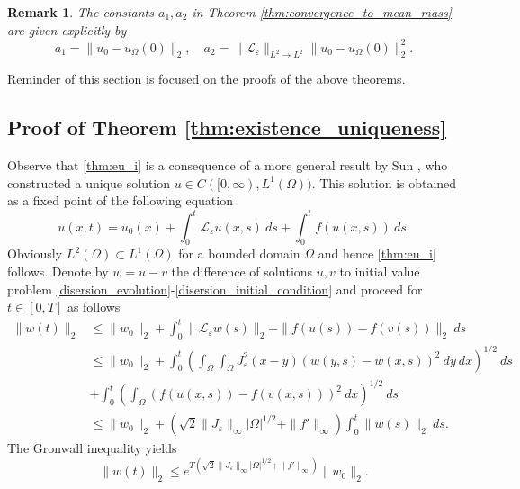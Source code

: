 \documentclass[12pt, a4paper]{article}
\theoremstyle{break}
\theoremstyle{break}
\theoremstyle{break}
\newtheorem{rem}{Remark}[section]
\theoremstyle{break}
\theoremstyle{break}
\newcommand{\Leo}{\mathcal{L}_{\varepsilon}}
\begin{document}
\begin{rem}
    The constants $a_1, a_2$ in Theorem \ref{thm:convergence_to_mean_mass} are given explicitly by
    \begin{equation*}
        a_1 = \|u_0 - u_{\Omega}(0)\|_2, \quad a_2 = \|\Leo\|_{L^2 \rightarrow L^2} \|u_0 - u_{\Omega}(0)\|_2^2. \label{thm:mean_mass_convergence}
    \end{equation*}
\end{rem}

Reminder of this section is focused on the proofs of the above theorems.

\subsection{Proof of Theorem \ref{thm:existence_uniqueness}}

Observe that \ref{thm:eu_i} is a consequence of a more general result by Sun \cite{Sun2022}, who constructed a unique solution $u \in C([0, \infty), L^1(\Omega))$. This solution is obtained as a fixed point of the following equation
\begin{equation}
    u(x,t) = u_0(x) + \int_0^t \Leo u(x,s) \:ds + \int_0^t f(u(x,s))\:ds.
    \label{ala_duhamel_formula}
\end{equation}
Obviously $L^2(\Omega) \subset L^1(\Omega)$ for a bounded domain $\Omega$ and hence \ref{thm:eu_i} follows. Denote by $w = u - v$ the difference of solutions $u, v$ to initial value problem \eqref{disersion_evolution}-\eqref{disersion_initial_condition} and proceed for $t \in [0, T]$ as follows
\begin{align*}
    \| w(t) \|_2 &\leq \|w_0\|_2 + \int_0^t \|\Leo w (s)\|_2 + \|f(u(s)) - f(v(s))\|_2 \:ds \\
    &\leq \|w_0\|_2 + \int_0^t\left(\int_\Omega \int_\Omega J_\varepsilon^2(x-y)\left(w(y, s) - w(x, s)\right)^2\:dy\:dx\right)^{1/2}\:ds \\
    &+ \int_0^t\left(\int_\Omega \left(f(u(x,s)) - f(v(x,s))\right)^2\:dx\right)^{1/2}\:ds \\
    &\leq \|w_0\|_2 + \left( \sqrt{2}\|J_\varepsilon\|_\infty |\Omega|^{1/2} + \|f'\|_\infty \right) \int_0^t \|w(s)\|_2 \:ds.
\end{align*}
The Gronwall inequality yields
\begin{equation*}
    \|w(t)\|_2 \leq e^{T \left( \sqrt{2}\|J_\varepsilon\|_\infty |\Omega|^{1/2} + \|f'\|_\infty \right)} \|w_0\|_2.
\end{equation*}
\end{document}
